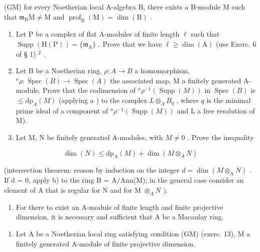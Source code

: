 (GM) for every Noetherian local A-algebra B, there exists a B-module M such that \(\mathfrak{m}_{\mathrm{B}}\mathrm{M}\neq\mathrm{M}\) and \(\operatorname{prof}_{\mathrm{B}}(\mathrm{M})=\dim(\mathrm{B})\) .

\begin{enumerate}
\def\labelenumi{\alph{enumi})}
\item
  Let P be a complex of flat A-modules of finite length \(\ell\) such that \(\operatorname{Supp}(\mathrm{H}(\mathrm{P})) = \{\mathfrak{m}_{\mathrm{A}}\}\) . Prove that we have \(\ell \geqslant \dim(\mathrm{A})\) (use Exerc. 6 of § 1) \(^2\) .
\item
  Let B be a Noetherian ring, \(\rho: A \to B\) a homomorphism, \(^a\rho: \operatorname{Spec}(B) \to \operatorname{Spec}(A)\) the associated map, M a finitely generated A-module. Prove that the codimension of \(^a\rho^{-1}(\operatorname{Supp}(M))\) in \(\operatorname{Spec}(B)\) is \(\leqslant \mathrm{dp}_A(M)\) (applying \(a\) ) to the complex \(L \otimes_A B_q\) , where \(q\) is the minimal prime ideal of a component of \(^a\rho^{-1}(\operatorname{Supp}(M))\) and L a free resolution of M).
\item
  Let M, N be finitely generated A-modules, with \(M \neq 0\) . Prove the inequality
\end{enumerate}

\[
\dim (N) \leqslant \mathrm{dp} _ {A} (M) + \dim (M \otimes_ {A} N)
\]

(intersection theorem: reason by induction on the integer \(d = \dim(M \otimes_{\mathrm{A}} N)\) . If d = 0, apply b) to the ring B = A/Ann(M); in the general case consider an element of A that is regular for N and for M \(\otimes_{A} N\) ).

\begin{enumerate}
\def\labelenumi{\alph{enumi})}
\setcounter{enumi}{3}
\tightlist
\item
  For there to exist an A-module of finite length and finite projective dimension, it is necessary and sufficient that A be a Macaulay ring.
\end{enumerate}

\begin{enumerate}
\def\labelenumi{\arabic{enumi})}
\setcounter{enumi}{13}
\tightlist
\item
  Let \(\mathrm{A}\) be a Noetherian local ring satisfying condition (GM) (exerc. 13), M a finitely generated A-module of finite projective dimension.
\end{enumerate}

